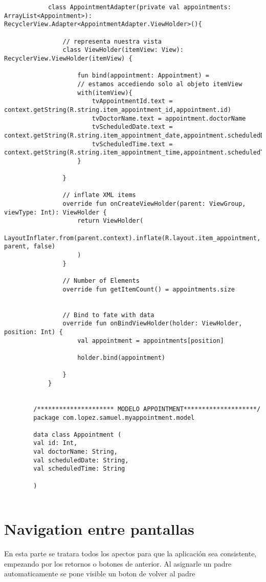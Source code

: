 \documentclass[a4paper]{article}
\begin{document}
\begin{lstlisting}
			class AppointmentAdapter(private val appointments: ArrayList<Appointment>): RecyclerView.Adapter<AppointmentAdapter.ViewHolder>(){
				
				// representa nuestra vista
				class ViewHolder(itemView: View): RecyclerView.ViewHolder(itemView) {
					
					fun bind(appointment: Appointment) =
					// estamos accediendo solo al objeto itemView
					with(itemView){
						tvAppointmentId.text = context.getString(R.string.item_appointment_id,appointment.id)
						tvDoctorName.text = appointment.doctorName
						tvScheduledDate.text = context.getString(R.string.item_appointment_date,appointment.scheduledDate)
						tvScheduledTime.text = context.getString(R.string.item_appointment_time,appointment.scheduledTime)
					}
					
				}
				
				// inflate XML items
				override fun onCreateViewHolder(parent: ViewGroup, viewType: Int): ViewHolder {
					return ViewHolder(
					LayoutInflater.from(parent.context).inflate(R.layout.item_appointment, parent, false)
					)
				}
				
				// Number of Elements
				override fun getItemCount() = appointments.size
				
				
				// Bind to fate with data
				override fun onBindViewHolder(holder: ViewHolder, position: Int) {
					val appointment = appointments[position]
					
					holder.bind(appointment)
					
				}
			}
		
		
		/********************* MODELO APPOINTMENT********************/
		package com.lopez.samuel.myappointment.model
		
		data class Appointment (
		val id: Int,
		val doctorName: String,
		val scheduledDate: String,
		val scheduledTime: String
		
		)
			
		\end{lstlisting}
	
	
		\section{Navigation entre pantallas}
		
		En esta parte se tratara todos los apectos para que la aplicación sea consistente, empezando por los retornos o botones de anterior. Al asignarle un padre automaticamente se pone visible un boton de volver al padre
		
\end{document}
